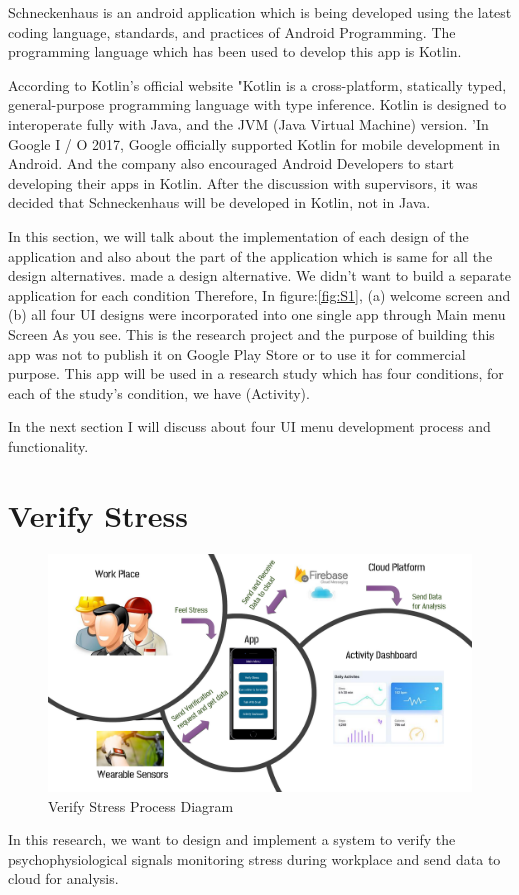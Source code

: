 Schneckenhaus is an android application which is being developed using the latest coding language, standards, and practices of Android Programming. The programming language which  has been used to develop this app is Kotlin. 

According to Kotlin's official website "Kotlin is a cross-platform, statically typed, general-purpose programming language with type inference. Kotlin is designed to interoperate fully with Java, and the JVM (Java Virtual  Machine) version. 'In Google I / O 2017, Google officially supported Kotlin for mobile development in Android. And the company also encouraged Android Developers to start developing their apps in Kotlin. After the discussion with supervisors, it was decided that Schneckenhaus will be  developed in Kotlin, not in Java. 

In this section, we will talk about the implementation of each design of the application and also about  the part of the application which is same for all the design alternatives.  made a design alternative.  We didn't want to build a separate application for each condition Therefore, In figure:\ref{fig:S1}, (a) welcome screen and (b) all four \acs{UI} designs were incorporated into one single app through Main menu Screen As you see. This is the research project and the purpose of building this app was not to publish it on  Google Play Store or to use it for commercial purpose.  This app will be used in a research study which has four conditions, for each of the study's condition, we have (Activity).

In the next section I will discuss about four \acf{UI} menu development process and functionality.

\section{Verify Stress}
\begin{figure}[hbt!] 
  \centering
  \includegraphics[width=1.0\linewidth]{chap4/image4/firbase.pdf}
  \caption[Verify Stress Process Diagram ]{Verify Stress Process Diagram}
  \label{fig:Verify_Stress}
\end{figure}
In  this  research,  we  want  to  design  and  implement a system  to verify the psychophysiological signals monitoring stress during workplace and send data to cloud for analysis. 


